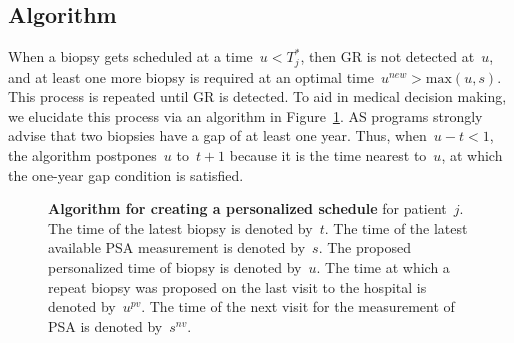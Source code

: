 \subsection{Algorithm}
\label{c2:subsec:pers_sched_algorithm}
When a biopsy gets scheduled at a time~$u < T^*_j$, then GR is not detected at~$u$, and at least one more biopsy is required at an optimal time~$u^{new} > \mbox{max}(u,s)$. This process is repeated until GR is detected. To aid in medical decision making, we elucidate this process via an algorithm in Figure~\ref{c2:fig:1}. AS programs strongly advise that two biopsies have a gap of at least one year. Thus, when~$u - t < 1$, the algorithm postpones~$u$ to~$t + 1$ because it is the time nearest to~$u$, at which the one-year gap condition is satisfied.
\begin{figure}

\caption{\textbf{Algorithm for creating a personalized schedule} for patient~$j$. The time of the latest biopsy is denoted by~$t$. The time of the latest available PSA measurement is denoted by~$s$. The proposed personalized time of biopsy is denoted by~$u$. The time at which a repeat biopsy was proposed on the last visit to the hospital is denoted by~$u^{pv}$. The time of the next visit for the measurement of PSA is denoted by~$s^{nv}$.} 
\label{c2:fig:1}
\end{figure}